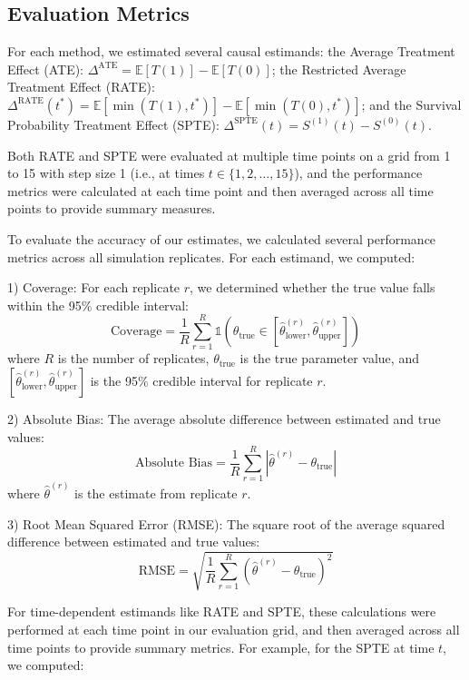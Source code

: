 \documentclass[useAMS,referee]{biom}
\begin{document}
\subsection{Evaluation Metrics}

For each method, we estimated several causal estimands: the Average Treatment Effect (ATE): $\Delta^{\text{ATE}} = \mathbb{E}[T(1)] - \mathbb{E}[T(0)]$; the Restricted Average Treatment Effect (RATE): $\Delta^{\text{RATE}}(t^*) = \mathbb{E}[\min(T(1), t^*)] - \mathbb{E}[\min(T(0), t^*)]$; and the Survival Probability Treatment Effect (SPTE): $\Delta^{\text{SPTE}}(t) = S^{(1)}(t) - S^{(0)}(t)$. 

Both RATE and SPTE were evaluated at multiple time points on a grid from 1 to 15 with step size 1 (i.e., at times $t \in \{1, 2, \ldots, 15\}$), and the performance metrics were calculated at each time point and then averaged across all time points to provide summary measures.

To evaluate the accuracy of our estimates, we calculated several performance metrics across all simulation replicates. For each estimand, we computed:

1) Coverage: For each replicate $r$, we determined whether the true value falls within the 95\% credible interval:
\begin{equation}
\text{Coverage} = \frac{1}{R}\sum_{r=1}^{R}\mathds{1}(\theta_{\text{true}} \in [\hat{\theta}_{\text{lower}}^{(r)}, \hat{\theta}_{\text{upper}}^{(r)}])
\end{equation}
where $R$ is the number of replicates, $\theta_{\text{true}}$ is the true parameter value, and $[\hat{\theta}_{\text{lower}}^{(r)}, \hat{\theta}_{\text{upper}}^{(r)}]$ is the 95\% credible interval for replicate $r$.

2) Absolute Bias: The average absolute difference between estimated and true values:
\begin{equation}
\text{Absolute Bias} = \frac{1}{R}\sum_{r=1}^{R}|\hat{\theta}^{(r)} - \theta_{\text{true}}|
\end{equation}
where $\hat{\theta}^{(r)}$ is the estimate from replicate $r$.

3) Root Mean Squared Error (RMSE): The square root of the average squared difference between estimated and true values:
\begin{equation}
\text{RMSE} = \sqrt{\frac{1}{R}\sum_{r=1}^{R}(\hat{\theta}^{(r)} - \theta_{\text{true}})^2}
\end{equation}

For time-dependent estimands like RATE and SPTE, these calculations were performed at each time point in our evaluation grid, and then averaged across all time points to provide summary metrics. For example, for the SPTE at time $t$, we computed:
\end{document}
